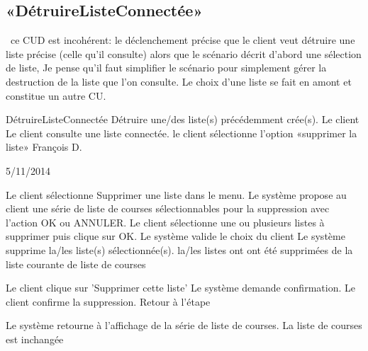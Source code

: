 \subsection{«DétruireListeConnectée»}
\TODO\ ce CUD est incohérent: le déclenchement précise que le client veut détruire une liste précise (celle qu'il consulte) alors que le scénario décrit d'abord une sélection de liste, \etc
Je pense qu'il faut simplifier le scénario pour simplement gérer la destruction de la liste que l'on consulte.
Le choix d'une liste se fait en amont et constitue un autre CU.

\startCU
\nom DétruireListeConnectée
\but Détruire une/des liste(s) précédemment crée(s).
\acteur Le client
\precondition Le client consulte une liste connectée.
\declenchement le client sélectionne l'option «supprimer la liste»
\auteur François D.
\date 05/11/2014

\nominal %
\startnominal
{} Le client sélectionne Supprimer une liste dans le menu.
\etape Le système propose au client une série de liste de courses sélectionnables pour la suppression avec l'action OK ou ANNULER.
 Le client sélectionne une ou plusieurs listes à supprimer puis clique sur OK.
 Le système valide le choix du client
 Le système supprime la/les liste(s) sélectionnée(s).
\stopnominal
\postcondition la/les listes ont ont été supprimées de la liste courante de liste de courses

\alternatifs 
{} 
  \etape Le client clique sur 'Supprimer cette liste'
  \etape Le système demande confirmation.
  \etape Le client confirme la suppression.
  \etape Retour à l'étape 
\stopcondition
\stopalternatif

\exception 
{} 
  \etape Le système retourne à l'affichage de la série de liste de courses.
\stopcondition
\postcondition La liste de courses est inchangée
\stopalternatif
\stopCU
